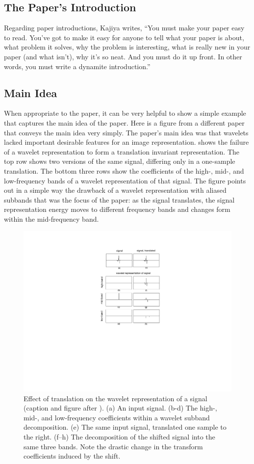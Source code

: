 \subsection{The Paper's Introduction}
Regarding paper introductions, Kajiya \cite{Kajiya1993} writes,
``You must make your paper easy to read. You've got to make it easy for anyone to tell what your paper is about, what problem it solves, why the problem is interesting, what is really new in your paper (and what isn't), why it's so neat. And you must do it up front. In other words, you must write a dynamite introduction.''

\subsection{Main Idea}
When appropriate to the paper, it can be very helpful to show a simple example that captures the main idea of the paper.  Here is a figure from a different paper \cite{Simoncelli92} that conveys the main idea very simply.  The paper's main idea was that wavelets lacked important desirable features for an image representation.  \Fig{\ref{fig:wavelet}} shows the failure of a wavelet representation to form a  translation invariant representation.  The top row shows two versions of the same signal, differing only in a one-sample translation.  The bottom three rows show the coefficients of the high-, mid-, and low-frequency bands of a wavelet representation of that signal.  The figure points out in a simple way the drawback of a wavelet representation with aliased subbands that was the focus of the paper:  as the signal translates, the signal representation energy moves to different frequency bands and changes form within the mid-frequency band.


\begin{figure}
    \centerline{
        \includegraphics[width=0.65\linewidth]{figures/papers/wavelet2.pdf}}
    \caption{Effect of translation on the wavelet representation of a signal  (caption and figure after \cite{Simoncelli92}).  (a) An input signal.  (b-d) The high-, mid-, and low-frequency coefficients within a wavelet subband decomposition.  (e) The same input signal, translated one sample to the right.  (f–h) The decomposition of the shifted signal into the same three bands.  Note the drastic change in the transform coefficients induced by the shift.}
    \label{fig:wavelet}
\end{figure}


